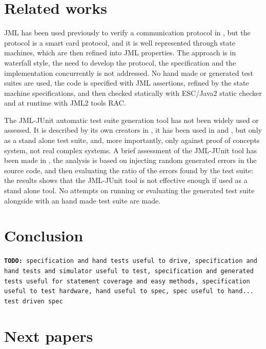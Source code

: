 \documentclass{article} \usepackage{times}
\newcommand{\todo}[1]{\texttt{\textbf{TODO:} #1}}
\begin{document}
\section{Related works}
\label{sec:related_works}

JML has been used previously to verify a communication protocol in
\cite{Hubbers2004}, but the protocol is a smart card protocol, and it
is well represented through state machines, which are then refined
into JML properties.  The approach is in waterfall style, the need to
develop the protocol, the specification and the implementation
concurrently is not addressed.  No hand made or generated test suites
are used, the code is specified with JML assertions, refined by the
state machine specifications, and then checked statically with
ESC/Java2 static checker\cite{CokKiniry04} and at runtime with JML2
tools RAC\cite{BurdyEtal05-STTT}.

The JML-JUnit automatic test suite generation tool has not been widely
used or assessed. It is described by its own creators in
\cite{Cheon2002,Cheon2004,Cheon2005}, it has been used in
\cite{Oriat2004} and \cite{Cheon2005}, but only as a stand alone test
suite, and, more importantly, only against proof of concepts system,
not real complex systems.  A brief assessment of the JML-JUnit tool
has been made in \cite{Tan2004}, the analysis is based on injecting
random generated errors in the source code, and then evaluating the
ratio of the errors found by the test suite: the results shows that
the JML-JUnit tool is not effective enough if used as a stand alone
tool. No attempts on running or evaluating the generated test suite
alongside with an hand made test suite are made.



\section{Conclusion}
\label{sec:conclusion}


\todo{specification and hand tests useful to drive, specification and
  hand tests and simulator useful to test, specification and generated
  tests useful for statement coverage and easy methods, specification
  useful to test hardware, hand useful to spec, spec useful to
  hand... test driven spec}


\section{Next papers}
\end{document}
